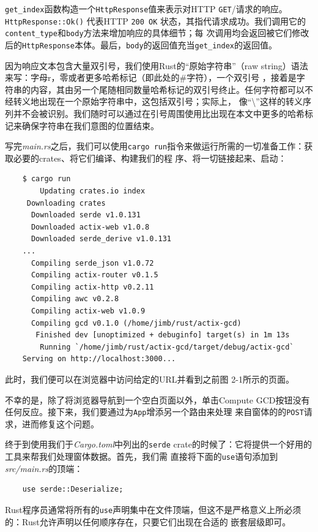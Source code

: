 \medskip
\texttt{get\_index}函数构造一个\texttt{HttpResponse}值来表示对HTTP \texttt{GET}/请求的响应。\texttt{HttpResponse::Ok()}
代表HTTP \texttt{200 OK} 状态，其指代请求成功。我们调用它的\texttt{content\_type}和\texttt{body}方法来增加响应的具体细节；每
次调用均会返回被它们修改后的\texttt{HttpResponse}本体。最后，\texttt{body}的返回值充当\texttt{get\_index}的返回值。

\medskip
因为响应文本包含大量双引号，我们使用Rust的“原始字符串”（raw string）语法来写：字母r，零或者更多哈希标记（即此处的\#字符），一个双引号
，接着是字符串的内容，其由另一个尾随相同数量哈希标记的双引号终止。任何字符都可以不经转义地出现在一个原始字符串中，这包括双引号；实际上，
像“\textbackslash”这样的转义序列并不会被识别。我们随时可以通过在引号周围使用比出现在本文中更多的哈希标记来确保字符串在我们意图的位置结束。

\medskip
写完\textit{main.rs}之后，我们可以使用\texttt{cargo run}指令来做运行所需的一切准备工作：获取必要的crates、将它们编译、构建我们的程
序、将一切链接起来、启动：
\begin{verbatim}
    $ cargo run
        Updating crates.io index
     Downloading crates
      Downloaded serde v1.0.131
      Downloaded actix-web v1.0.8
      Downloaded serde_derive v1.0.131
    ...
      Compiling serde_json v1.0.72
      Compiling actix-router v0.1.5
      Compiling actix-http v0.2.11
      Compiling awc v0.2.8
      Compiling actix-web v1.0.9
      Compiling gcd v0.1.0 (/home/jimb/rust/actix-gcd)
       Finished dev [unoptimized + debuginfo] target(s) in 1m 13s
        Running `/home/jimb/rust/actix-gcd/target/debug/actix-gcd`
    Serving on http://localhost:3000...
\end{verbatim}

\medskip
此时，我们便可以在浏览器中访问给定的URL并看到之前图 2-1所示的页面。

\medskip
不幸的是，除了将浏览器导航到一个空白页面以外，单击Compute GCD按钮没有任何反应。接下来，我们要通过为\texttt{App}增添另一个路由来处理
来自窗体的的\texttt{POST}请求，进而修复这个问题。

\medskip
终于到使用我们于\textit{Cargo.toml}中列出的\texttt{serde} crate的时候了：它将提供一个好用的工具来帮我们处理窗体数据。首先，我们需
直接将下面的\texttt{use}语句添加到\textit{src/main.rs}的顶端：
\begin{verbatim}
    use serde::Deserialize;
\end{verbatim}

\smallskip
Rust程序员通常将所有的\texttt{use}声明集中在文件顶端，但这不是严格意义上所必须的：Rust允许声明以任何顺序存在，只要它们出现在合适的
嵌套层级即可。

